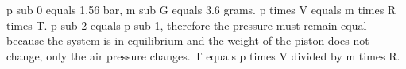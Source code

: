 p sub 0 equals 1.56 bar, m sub G equals 3.6 grams. p times V equals m times R times T. p sub 2 equals p sub 1, therefore the pressure must remain equal because the system is in equilibrium and the weight of the piston does not change, only the air pressure changes. T equals p times V divided by m times R.